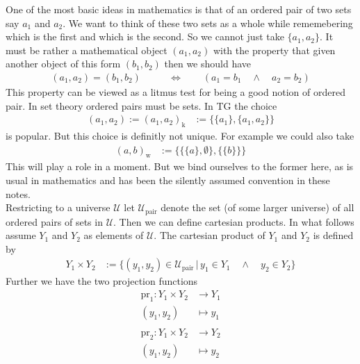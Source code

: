 One of the most basic ideas in mathematics is that of an ordered pair of two sets say $a_{1}$ and $a_{2}$. We want to think of these two sets as a whole while rememebering which is the first and which is the second. So we cannot just take $\lbrace a_{1},a_{2} \rbrace$. It must be rather a mathematical object $(a_{1},a_{2})$ with the property that given another object of this form $(b_{1},b_{2})$ then we should have
\begin{align*}
  (a_{1},a_{2})
  =
  (b_{1},b_{2})
  \qquad
  &\Leftrightarrow
  \qquad
  \left(
    a_{1}
    =
    b_{1}
    \quad
    \land
    \quad
    a_{2}
    =
    b_{2}
  \right)
\end{align*}
This property can be viewed as a litmus test for being a good notion of ordered pair. In set theory ordered pairs must be sets. In TG the choice
\begin{align*}
  (a_{1},a_{2})
  :=
  (a_{1},a_{2})_{\textrm{k}}
  &:=
  \lbrace
    \lbrace
      a_{1}
    \rbrace,
    \lbrace
      a_{1},a_{2}
    \rbrace
  \rbrace
\end{align*}
is popular. But this choice is definitly not unique. For example we could also take
\begin{align*}
  (a,b)_{\textrm{w}}
  &:=
  \lbrace
    \lbrace
      \lbrace
        a
      \rbrace,
      \emptyset
    \rbrace,
    \lbrace
      \lbrace
        b
      \rbrace
    \rbrace
  \rbrace
\end{align*}
This will play a role in a moment. But we bind ourselves to the former here, as is usual in mathematics and has been the silently assumed convention in these notes.
\\
Restricting to a universe $\mathcal{U}$ let $\mathcal{U}_{\textrm{pair}}$ denote the set (of some larger universe) of all ordered pairs of sets in $\mathcal{U}$. Then we can define cartesian products. In what follows assume $Y_{1}$ and $Y_{2}$ as elements of $\mathcal{U}$. The cartesian product of $Y_{1}$ and $Y_{2}$ is defined by
\begin{align*}
  Y_{1}
  \times
  Y_{2}
  &:=
  \lbrace
      (y_{1},y_{2})
      \in
      \mathcal{U}_{\textrm{pair}}
    \,
    \vert
    \,
      y_{1}
      \in
      Y_{1}
      \quad
      \land
      \quad
      y_{2}
      \in
      Y_{2}
  \rbrace
\end{align*}
Further we have the two projection functions
\begin{align*}
  \mathrm{pr}_{1}
  \colon
  Y_{1}
  \times
  Y_{2}
  &\rightarrow
  Y_{1}
  \\
  (y_{1},y_{2})
  &\mapsto
  y_{1}
  \\\\
  \mathrm{pr}_{2}
  \colon
  Y_{1}
  \times
  Y_{2}
  &\rightarrow
  Y_{2}
  \\
  (y_{1},y_{2})
  &\mapsto
  y_{2}
\end{align*}
